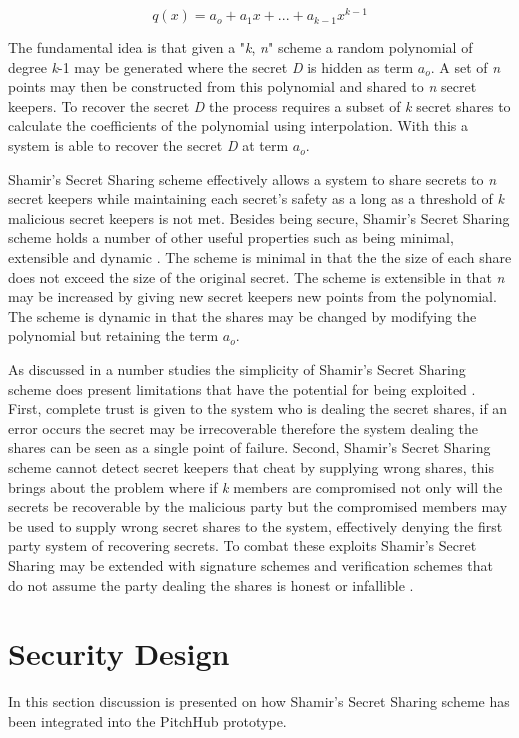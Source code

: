 \[q(x) = a_o +a_1x + ... + a_{k-1}x^{k-1} \]

The fundamental idea is that given a "\textit{k}, \textit{n}" scheme a random polynomial of degree \textit{k}-1 may be generated where the secret \textit{D} is hidden as term \(a_o\). A set of \textit{n} points may then be constructed from this polynomial and shared to \textit{n} secret keepers. To recover the secret \textit{D} the process requires a subset of \textit{k} secret shares to calculate the coefficients of the polynomial using interpolation. With this a system is able to recover the secret \textit{D} at term \(a_o\).
\par
Shamir's Secret Sharing scheme effectively allows a system to share secrets to \textit{n} secret keepers while maintaining each secret's safety as a long as a threshold of \textit{k} malicious secret keepers is not met. Besides being secure, Shamir's Secret Sharing scheme holds a number of other useful properties such as being minimal, extensible and dynamic \cite{shamir1979share}. The scheme is minimal in that the the size of each share does not exceed the size of the original secret. The scheme is extensible in that \textit{n} may be increased by giving new secret keepers new points from the polynomial. The scheme is dynamic in that the shares may be changed by modifying the polynomial but retaining the term \(a_o\).
\par
As discussed in a number studies the simplicity of Shamir's Secret Sharing scheme does present limitations that have the potential for being exploited \cite{abdallah2015analysis}\cite{dautrich2012security}. First, complete trust is given to the system who is dealing the secret shares, if an error occurs the secret may be irrecoverable therefore the system dealing the shares can be seen as a single point of failure. Second, Shamir's Secret Sharing scheme cannot detect secret keepers that cheat by supplying wrong shares, this brings about the problem where if \textit{k} members are compromised not only will the secrets be recoverable by the malicious party but the compromised members may be used to supply wrong secret shares to the system, effectively denying the first party system of recovering secrets. To combat these exploits Shamir's Secret Sharing may be extended with signature schemes \cite{shoup2000practical}\cite{abdalla2001forward} and verification schemes that do not assume the party dealing the shares is honest or infallible \cite{herzberg1995proactive}\cite{cachin2002asynchronous}.

\section{Security Design}
In this section discussion is presented on how Shamir's Secret Sharing scheme has been integrated into the PitchHub prototype.

